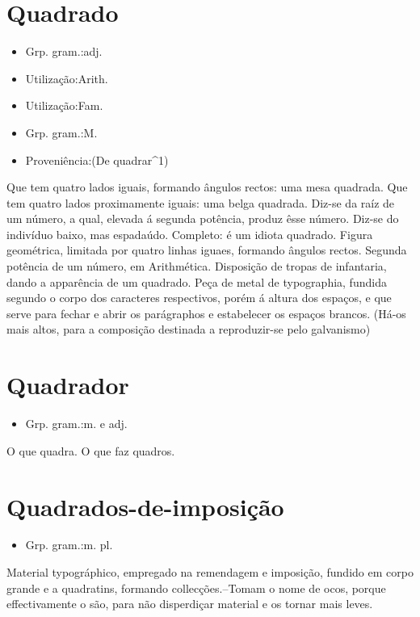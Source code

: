 \section{Quadrado}
\begin{itemize}
\item {Grp. gram.:adj.}
\end{itemize}
\begin{itemize}
\item {Utilização:Arith.}
\end{itemize}
\begin{itemize}
\item {Utilização:Fam.}
\end{itemize}
\begin{itemize}
\item {Grp. gram.:M.}
\end{itemize}
\begin{itemize}
\item {Proveniência:(De \textunderscore quadrar\textunderscore ^1)}
\end{itemize}
Que tem quatro lados iguais, formando ângulos rectos: \textunderscore uma mesa quadrada\textunderscore .
Que tem quatro lados proximamente iguais: \textunderscore uma belga quadrada\textunderscore .
Diz-se da raíz de um número, a qual, elevada á segunda potência, produz êsse número.
Diz-se do indivíduo baixo, mas espadaúdo.
Completo: \textunderscore é um idiota quadrado\textunderscore .
Figura geométrica, limitada por quatro linhas iguaes, formando ângulos rectos.
Segunda potência de um número, em Arithmética.
Disposição de tropas de infantaria, dando a apparência de um quadrado.
Peça de metal de typographia, fundida segundo o corpo dos caracteres respectivos, porém á altura dos espaços, e que serve para fechar e abrir os parágraphos e estabelecer os espaços brancos. (Há-os mais altos, para a composição destinada a reproduzir-se pelo galvanismo)
\section{Quadrador}
\begin{itemize}
\item {Grp. gram.:m.  e  adj.}
\end{itemize}
O que quadra.
O que faz quadros.
\section{Quadrados-de-imposição}
\begin{itemize}
\item {Grp. gram.:m. pl.}
\end{itemize}
Material typográphico, empregado na remendagem e imposição, fundido em corpo grande e a quadratins, formando collecções.--Tomam o nome de ocos, porque effectivamente o são, para não disperdiçar material e os tornar mais leves.
